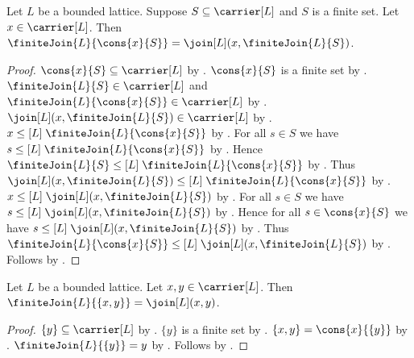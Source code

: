\begin{proposition}\label{finite_join_cons}
    Let $L$ be a bounded lattice.
    Suppose $S\subseteq\carrier[L]$ and $S$ is a finite set.
    Let $x\in\carrier[L]$.
    Then
        $\finiteJoin{L}{\cons{x}{S}}
            =\join[L](x,\finiteJoin{L}{S})$.
\end{proposition}
\begin{proof}
    $\cons{x}{S}\subseteq\carrier[L]$ by
        .
    $\cons{x}{S}$ is a finite set by .
    $\finiteJoin{L}{S}\in\carrier[L]$ and
        $\finiteJoin{L}{\cons{x}{S}}\in\carrier[L]$ by
        .
    $\join[L](x,\finiteJoin{L}{S})\in\carrier[L]$ by
        .
    $x\mathrel{\leq[L]}\finiteJoin{L}{\cons{x}{S}}$ by
        .
    For all $s\in S$ we have
        $s\mathrel{\leq[L]}\finiteJoin{L}{\cons{x}{S}}$ by
        .
    Hence $\finiteJoin{L}{S}
        \mathrel{\leq[L]}\finiteJoin{L}{\cons{x}{S}}$ by
        .
    Thus $\join[L](x,\finiteJoin{L}{S})
        \mathrel{\leq[L]}\finiteJoin{L}{\cons{x}{S}}$ by
        .
    $x\mathrel{\leq[L]}\join[L](x,\finiteJoin{L}{S})$ by
        .
    For all $s\in S$ we have
        $s\mathrel{\leq[L]}\join[L](x,\finiteJoin{L}{S})$ by
        .
    Hence for all $s\in\cons{x}{S}$ we have
        $s\mathrel{\leq[L]}\join[L](x,\finiteJoin{L}{S})$ by
        .
    Thus $\finiteJoin{L}{\cons{x}{S}}
        \mathrel{\leq[L]}\join[L](x,\finiteJoin{L}{S})$ by
        .
    Follows by
        .
\end{proof}

\begin{proposition}\label{finite_join_pair}
    Let $L$ be a bounded lattice.
    Let $x,y\in\carrier[L]$.
    Then $\finiteJoin{L}{\{x,y\}}=\join[L](x,y)$.
\end{proposition}
\begin{proof}
    $\{y\}\subseteq\carrier[L]$ by .
    $\{y\}$ is a finite set by .
    $\{x,y\}=\cons{x}{\{y\}}$ by
        .
    $\finiteJoin{L}{\{y\}}=y$ by .
    Follows by .
\end{proof}

